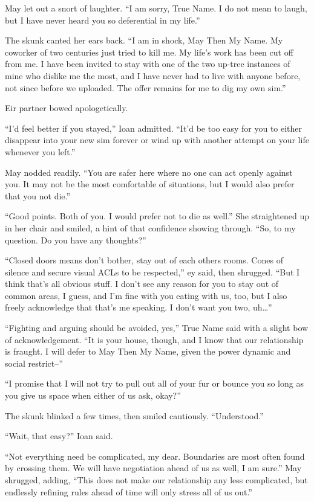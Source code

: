 May let out a snort of laughter. ``I am sorry, True Name. I do not mean to laugh, but I have never heard you so deferential in my life.''

The skunk canted her ears back. ``I am in shock, May Then My Name. My coworker of two centuries just tried to kill me. My life's work has been cut off from me. I have been invited to stay with one of the two up-tree instances of mine who dislike me the most, and I have never had to live with anyone before, not since before we uploaded. The offer remains for me to dig my own sim.''

Eir partner bowed apologetically.

``I'd feel better if you stayed,'' Ioan admitted. ``It'd be too easy for you to either disappear into your new sim forever or wind up with another attempt on your life whenever you left.''

May nodded readily. ``You are safer here where no one can act openly against you. It may not be the most comfortable of situations, but I would also prefer that you not die.''

``Good points. Both of you. I would prefer not to die as well.'' She straightened up in her chair and smiled, a hint of that confidence showing through. ``So, to my question. Do you have any thoughts?''

``Closed doors means don't bother, stay out of each others rooms. Cones of silence and secure visual ACLs to be respected,'' ey said, then shrugged. ``But I think that's all obvious stuff. I don't see any reason for you to stay out of common areas, I guess, and I'm fine with you eating with us, too, but I also freely acknowledge that that's me speaking. I don't want you two, uh\ldots{}''

``Fighting and arguing should be avoided, yes,'' True Name said with a slight bow of acknowledgement. ``It is your house, though, and I know that our relationship is fraught. I will defer to May Then My Name, given the power dynamic and social restrict--''

``I promise that I will not try to pull out all of your fur or bounce you so long as you give us space when either of us ask, okay?''

The skunk blinked a few times, then smiled cautiously. ``Understood.''

``Wait, that easy?'' Ioan said.

``Not everything need be complicated, my dear. Boundaries are most often found by crossing them. We will have negotiation ahead of us as well, I am sure.'' May shrugged, adding, ``This does not make our relationship any less complicated, but endlessly refining rules ahead of time will only stress all of us out.''

